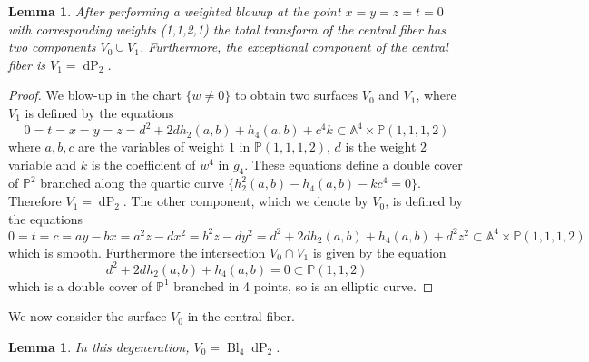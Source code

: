 \documentclass[a4paper]{amsart}
\theoremstyle{definition}
\theoremstyle{plain}
\newtheorem{lemma}[defn]{Lemma}
\theoremstyle{remark}
\newcommand{\PS}{\mathbb{P}}
\begin{document}
\begin{lemma}
After performing a weighted blowup at the point $x=y=z=t=0$ with corresponding weights (1,1,2,1) the total transform of the central fiber has two components $V_0 \cup V_1$. Furthermore, the exceptional component of the central fiber is $V_1 = \operatorname{dP}_2$.
\end{lemma}

\begin{proof}
We blow-up in the chart $\{w\neq0\}$ to obtain two surfaces $V_0$ and $V_1$, where $V_1$ is defined by the equations
$$0=t=x=y=z=d^2+2dh_2(a,b)+h_4(a,b) +c^4k \subset\mathbb{A}^4 \times \mathbb{P}(1,1,1,2)$$
where $a,b,c$ are the variables of weight $1$ in $\PS(1,1,1,2)$, $d$ is the weight $2$ variable and $k$ is the coefficient of $w^4$ in $g_4$. These equations define a double cover of $\PS^2$ branched along the quartic curve $\{h_2^2(a,b)-h_4(a,b)-kc^4=0\}$. Therefore $V_1 = \operatorname{dP}_2$. The other component, which we denote by $V_0$, is defined by the equations
$$0=t=c=ay-bx=a^2z-dx^2=b^2z-dy^2=d^2+2dh_2(a,b)+h_4(a,b)+d^2z^2\subset \mathbb{A}^4\times \PS(1,1,1,2)$$
which is smooth. Furthermore the intersection $V_0 \cap V_1$ is given by the equation
$$d^2+2dh_2(a,b)+h_4(a,b)=0 \subset \PS(1,1,2)$$
which is a double cover of $\PS^1$ branched in 4 points, so is an elliptic curve.
\end{proof}
We now consider the surface $V_0$ in the central fiber.

\begin{lemma}\label{lem: strict transform central fiber E7}
In this degeneration, $V_0 = \operatorname{Bl}_4\operatorname{dP}_2$.
\end{lemma}
\end{document}
